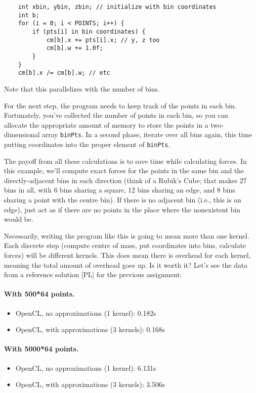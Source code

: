 \begin{lstlisting}
    int xbin, ybin, zbin; // initialize with bin coordinates
    int b;
    for (i = 0; i < POINTS; i++) {
        if (pts[i] in bin coordinates) {
            cm[b].x += pts[i].x; // y, z too
            cm[b].w += 1.0f;
        }
    }
    cm[b].x /= cm[b].w; // etc
\end{lstlisting}

 \noindent
Note that this parallelizes with the number of bins.

For the next step, the program needs to keep track of the points in
each bin. Fortunately, you've collected the number of points in each
bin, so you can allocate the appropriate amount of memory to store the
points in a two-dimensional array {\tt binPts}. In a second phase,
iterate over all bins again, this time putting coordinates into the
proper element of {\tt binPts}.


The payoff from all these calculations is to save time while
calculating forces. In this example, we'll compute exact
forces for the points in the same bin and the directly-adjacent bins
in each direction (think of a Rubik's Cube; that makes 27 bins in all,
with 6 bins sharing a square, 12 bins sharing an edge, and 8 bins
sharing a point with the centre bin). If there is no adjacent bin 
(i.e., this is an edge), just act as if there are no points 
in the place where the nonexistent bin would be. 

Necessarily, writing the program like this is going to mean more than one kernel.
Each discrete step (compute centre of mass, put coordinates into bins, 
calculate forces) will be different kernels. This does mean there is overhead for each kernel, meaning the total amount of overhead goes up. Is it worth it? Let's see the data from a reference solution [PL] for the previous assignment:

\paragraph{With 500*64 points.}
\begin{itemize}
\item    OpenCL, no approximations (1 kernel): 0.182s
\item    OpenCL, with approximations (3 kernels): 0.168s
\end{itemize}
 \paragraph{With 5000*64 points.}
\begin{itemize}
\item    OpenCL, no approximations (1 kernel): 6.131s
\item    OpenCL, with approximations (3 kernels): 3.506s
\end{itemize}

